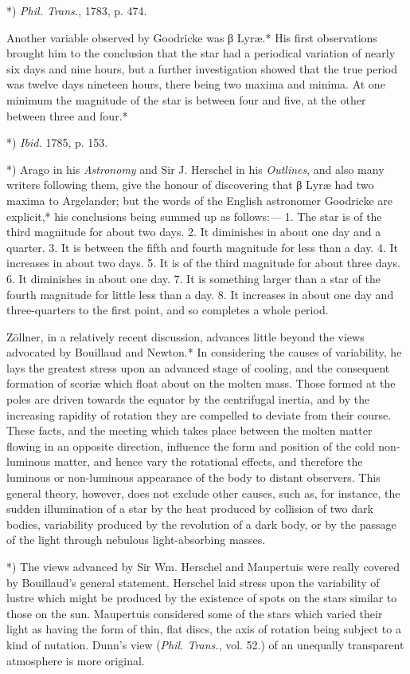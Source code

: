 \documentclass[a4paper, 12pt, oneside, polutonikogreek, english]{article}
\begin{document}
*) \emph{Phil. Trans.}, 1783, p. 474.

Another variable observed by Goodricke was β Lyræ.* His first observations brought him to the conclusion that the star had a periodical variation of nearly six days and nine hours, but a further investigation showed that the true period was twelve days nineteen hours, there being two maxima and minima. At one minimum the magnitude of the star is between four and five, at the other between three and four.*

*) \emph{Ibid.} 1785, p. 153.

*) Arago in his \emph{Astronomy} and Sir J. Herschel in his \emph{Outlines}, and also many writers following them, give the honour of discovering that β Lyræ had two maxima to Argelander; but the words of the English astronomer Goodricke are explicit,* his conclusions being summed up as follows:--- 1. The star is of the third magnitude for about two days. 2. It diminishes in about one day and a quarter. 3. It is between the fifth and fourth magnitude for less than a day. 4. It increases in about two days. 5. It is of the third magnitude for about three days. 6. It diminishes in about one day. 7. It is something larger than a star of the fourth magnitude for little less than a day. 8. It increases in about one day and three-quarters to the first point, and so completes a whole period.

Zöllner, in a relatively recent discussion, advances little beyond the views advocated by Bouillaud and Newton.* In considering the causes of variability, he lays the greatest stress upon an advanced stage of cooling, and the consequent formation of scoriæ which float about on the molten mass. Those formed at the poles are driven towards the equator by the centrifugal inertia, and by the increasing rapidity of rotation they are compelled to deviate from their course. These facts, and the meeting which takes place between the molten matter flowing in an opposite direction, influence the form and position of the cold non-luminous matter, and hence vary the rotational effects, and therefore the luminous or non-luminous appearance of the body to distant observers. This general theory, however, does not exclude other causes, such as, for instance, the sudden illumination of a star by the heat produced by collision of two dark bodies, variability produced by the revolution of a dark body, or by the passage of the light through nebulous light-absorbing masses.

*) The views advanced by Sir Wm. Herschel and Maupertuis were really covered by Bouillaud's general statement. Herschel laid stress upon the variability of lustre which might be produced by the existence of spots on the stars similar to those on the sun. Maupertuis considered some of the stars which varied their light as having the form of thin, flat discs, the axis of rotation being subject to a kind of nutation. Dunn's view (\emph{Phil. Trans.}, vol. 52.) of an unequally transparent atmosphere is more original.
\end{document}
